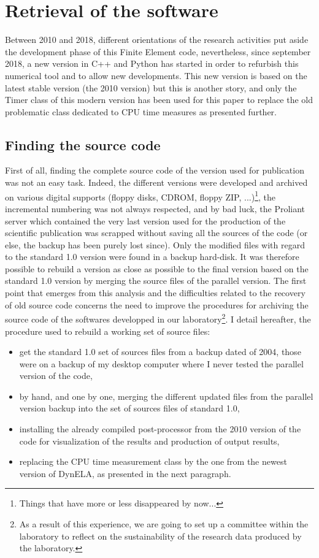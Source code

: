 \section{Retrieval of the software}

Between 2010 and 2018, different orientations of the research activities put aside the development phase of this Finite Element code, nevertheless, since september 2018, a new version in C++ and Python has started in order to refurbish this numerical tool and to allow new developments. This new version is based on the latest stable version (the 2010 version) but this is another story, and only the Timer class of this modern version has been used for this paper to replace the old problematic class dedicated to CPU time measures as presented further.

\subsection{Finding the source code}

First of all, finding the complete source code of the version used for publication was not an easy task. Indeed, the different versions were developed and archived on various digital supports (floppy disks, CDROM, floppy ZIP, ...)\footnote{Things that have more or less disappeared by now...}, the incremental numbering was not always respected, and by bad luck, the Proliant server which contained the very last version used for the production of the scientific publication was scrapped without saving all the sources of the code (or else, the backup has been purely lost since). Only the modified files with regard to the standard 1.0 version were found in a backup hard-disk. It was therefore possible to rebuild a version as close as possible to the final version based on the standard 1.0 version by merging the source files of the parallel version. The first point that emerges from this analysis and the difficulties related to the recovery of old source code concerns the need to improve the procedures for archiving the source code of the softwares developped in our laboratory\footnote{As a result of this experience, we are going to set up a committee within the laboratory to reflect on the sustainability of the research data produced by the laboratory.}. I detail hereafter, the procedure used to rebuild a working set of source files:
\begin{itemize}
\item get the standard 1.0 set of sources files from a backup dated of 2004, those were on a backup of my desktop computer where I never tested the parallel version of the code,
\item by hand, and one by one, merging the different updated files from the parallel version backup into the set of sources files of standard 1.0,
\item installing the already compiled post-processor from the 2010 version of the code for visualization of the results and production of output results,
\item replacing the CPU time measurement class by the one from the newest version of DynELA, as presented in the next paragraph.
\end{itemize}

